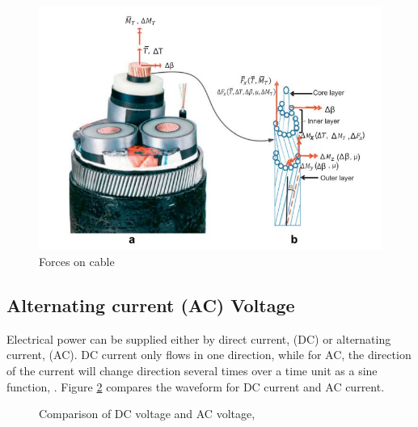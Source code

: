 \begin{figure}[H]
\centering
\includegraphics[scale=0.8]{figures/cable}
\caption[$\; \:$Forces on cable]{Forces on cable  \cite{Nasution2013} }
 \label{fig:cable}
\end{figure}

\subsection{Alternating current (AC) Voltage}
Electrical power can be supplied either by direct current, (DC) or alternating current, (AC). DC current only flows in one direction, while for AC, the direction of the current will change direction several times over a time unit as a sine function, \cite{Dale2000}. Figure \ref{fig:acdc} compares the waveform for DC current and AC current.


\begin{figure}[H]
\hfill
{}\hfill
\caption[$\; \:$Comparison of DC voltage and AC voltage]{Comparison of DC voltage and AC voltage, \cite{Dale2000}}
\label{fig:acdc}
\end{figure}

